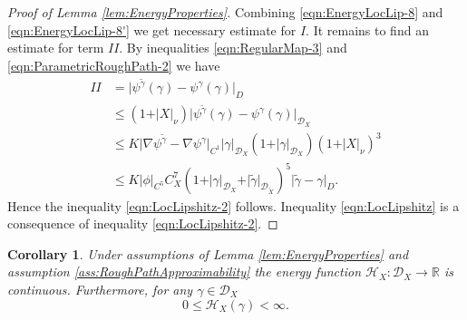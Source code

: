 \documentclass[11pt,a4paper,leqno]{amsart}%
\theoremstyle{plain}
\theoremstyle{remark}
\theoremstyle{plain}
\newtheorem{corollary}[theorem]{Corollary}
\numberwithin{equation}{section}
\def\Rnu{{\mathbb R}}
\begin{document}
\begin{proof}[ Proof of Lemma \ref{lem:EnergyProperties}]
Combining \eqref{eqn:EnergyLocLip-8} and
\eqref{eqn:EnergyLocLip-8'} we get necessary estimate for $I$. It
remains to find an estimate for term $II$. By inequalities
\eqref{eqn:RegularMap-3} and \eqref{eqn:ParametricRoughPath-2} we
have
\begin{align}
II&=\vert \psi^{\tilde{\gamma}}(\gamma)-\psi^{\gamma}(\gamma)\vert_D\nonumber\\
&\leq
(1+\vert X\vert_{\nu})\vert \psi^{\tilde{\gamma}}(\gamma)-\psi^{\gamma}(\gamma)\vert_{\mathcal{D}_X}\nonumber\\
&\leq K\vert \nabla\psi^{\tilde{\gamma}}-\nabla\psi^{\gamma}\vert_{C^1}
\vert \gamma\vert_{\mathcal{D}_X}(1+\vert \gamma\vert_{\mathcal{D}_X})(1+\vert X\vert_{\nu})^3
\nonumber\\
&\leq K\vert \phi\vert_{C^5}C_X^7(1+\vert \gamma\vert_{\mathcal{D}_X}+\vert \tilde{\gamma}\vert_{\mathcal{D}_{\tilde{X}}})^5
\vert \tilde{\gamma}-\gamma\vert_D.\label{eqn:EnergyLocLip-9}
\end{align}
Hence the inequality \eqref{eqn:LocLipshitz-2} follows. Inequality
\eqref{eqn:LocLipshitz} is a consequence of inequality
\eqref{eqn:LocLipshitz-2}.
\end{proof}
\begin{corollary}\label{cor:ContinuityEnergy}
Under assumptions of Lemma \ref{lem:EnergyProperties} and
assumption \ref{ass:RoughPathApproximability} the energy function 
$\mathcal{H}_X:\mathcal{D}_X\to\Rnu$ is  continuous. Furthermore, for any $\gamma\in\mathcal{D}_X$
$$
0\leq\mathcal{H}_X(\gamma)<\infty.
$$
\end{corollary}
\end{document}
